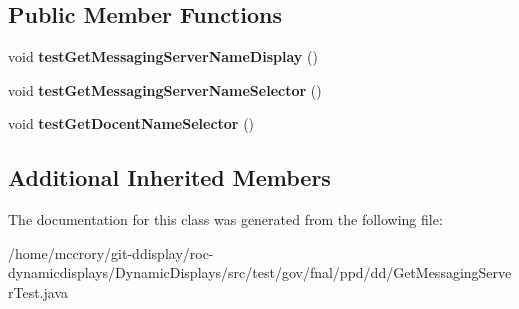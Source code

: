 \subsection*{Public Member Functions}
\begin{DoxyCompactItemize}
\item 
\hypertarget{classtest_1_1gov_1_1fnal_1_1ppd_1_1dd_1_1GetMessagingServerTest_a3601b6819ca638d7b1a0363eaa6ca475}{void {\bfseries test\-Get\-Messaging\-Server\-Name\-Display} ()}\label{classtest_1_1gov_1_1fnal_1_1ppd_1_1dd_1_1GetMessagingServerTest_a3601b6819ca638d7b1a0363eaa6ca475}

\item 
\hypertarget{classtest_1_1gov_1_1fnal_1_1ppd_1_1dd_1_1GetMessagingServerTest_a087a371914143672310e30fc4b71decc}{void {\bfseries test\-Get\-Messaging\-Server\-Name\-Selector} ()}\label{classtest_1_1gov_1_1fnal_1_1ppd_1_1dd_1_1GetMessagingServerTest_a087a371914143672310e30fc4b71decc}

\item 
\hypertarget{classtest_1_1gov_1_1fnal_1_1ppd_1_1dd_1_1GetMessagingServerTest_a797ca314d02f3394cad4c88f95eee5bc}{void {\bfseries test\-Get\-Docent\-Name\-Selector} ()}\label{classtest_1_1gov_1_1fnal_1_1ppd_1_1dd_1_1GetMessagingServerTest_a797ca314d02f3394cad4c88f95eee5bc}

\end{DoxyCompactItemize}
\subsection*{Additional Inherited Members}


The documentation for this class was generated from the following file\-:\begin{DoxyCompactItemize}
\item 
/home/mccrory/git-\/ddisplay/roc-\/dynamicdisplays/\-Dynamic\-Displays/src/test/gov/fnal/ppd/dd/Get\-Messaging\-Server\-Test.\-java\end{DoxyCompactItemize}
